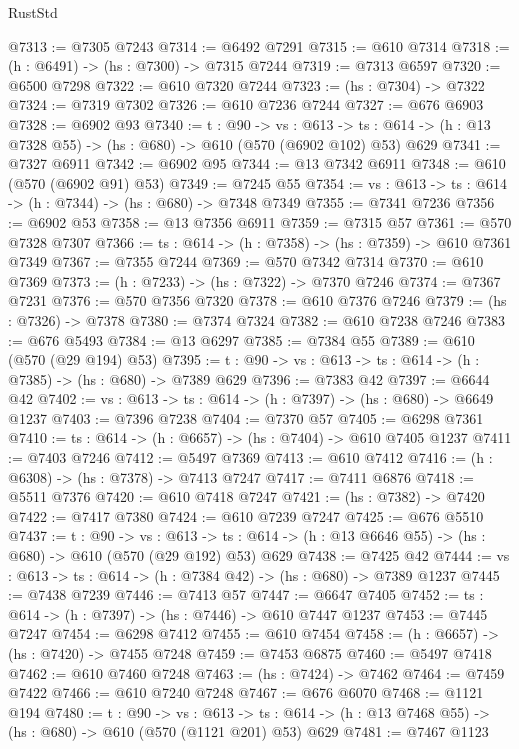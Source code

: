 \begin{lexlean}{RustStd}
\begin{coremodule}
@7313 := @7305 @7243
@7314 := @6492 @7291
@7315 := @610 @7314
@7318 := (h : @6491) -> (hs : @7300) -> @7315 @7244
@7319 := @7313 @6597
@7320 := @6500 @7298
@7322 := @610 @7320 @7244
@7323 := (hs : @7304) -> @7322
@7324 := @7319 @7302
@7326 := @610 @7236 @7244
@7327 := @676 @6903
@7328 := @6902 @93
@7340 := {t : @90} ->
  {vs : @613} ->
  {ts : @614} -> (h : @13 @7328 @55) -> (hs : @680) -> @610 (@570 (@6902 @102) @53) @629
@7341 := @7327 @6911
@7342 := @6902 @95
@7344 := @13 @7342 @6911
@7348 := @610 (@570 (@6902 @91) @53)
@7349 := @7245 @55
@7354 := {vs : @613} -> {ts : @614} -> (h : @7344) -> (hs : @680) -> @7348 @7349
@7355 := @7341 @7236
@7356 := @6902 @53
@7358 := @13 @7356 @6911
@7359 := @7315 @57
@7361 := @570 @7328 @7307
@7366 := {ts : @614} -> (h : @7358) -> (hs : @7359) -> @610 @7361 @7349
@7367 := @7355 @7244
@7369 := @570 @7342 @7314
@7370 := @610 @7369
@7373 := (h : @7233) -> (hs : @7322) -> @7370 @7246
@7374 := @7367 @7231
@7376 := @570 @7356 @7320
@7378 := @610 @7376 @7246
@7379 := (hs : @7326) -> @7378
@7380 := @7374 @7324
@7382 := @610 @7238 @7246
@7383 := @676 @5493
@7384 := @13 @6297
@7385 := @7384 @55
@7389 := @610 (@570 (@29 @194) @53)
@7395 := {t : @90} -> {vs : @613} -> {ts : @614} -> (h : @7385) -> (hs : @680) -> @7389 @629
@7396 := @7383 @42
@7397 := @6644 @42
@7402 := {vs : @613} -> {ts : @614} -> (h : @7397) -> (hs : @680) -> @6649 @1237
@7403 := @7396 @7238
@7404 := @7370 @57
@7405 := @6298 @7361
@7410 := {ts : @614} -> (h : @6657) -> (hs : @7404) -> @610 @7405 @1237
@7411 := @7403 @7246
@7412 := @5497 @7369
@7413 := @610 @7412
@7416 := (h : @6308) -> (hs : @7378) -> @7413 @7247
@7417 := @7411 @6876
@7418 := @5511 @7376
@7420 := @610 @7418 @7247
@7421 := (hs : @7382) -> @7420
@7422 := @7417 @7380
@7424 := @610 @7239 @7247
@7425 := @676 @5510
@7437 := {t : @90} ->
  {vs : @613} ->
  {ts : @614} -> (h : @13 @6646 @55) -> (hs : @680) -> @610 (@570 (@29 @192) @53) @629
@7438 := @7425 @42
@7444 := {vs : @613} -> {ts : @614} -> (h : @7384 @42) -> (hs : @680) -> @7389 @1237
@7445 := @7438 @7239
@7446 := @7413 @57
@7447 := @6647 @7405
@7452 := {ts : @614} -> (h : @7397) -> (hs : @7446) -> @610 @7447 @1237
@7453 := @7445 @7247
@7454 := @6298 @7412
@7455 := @610 @7454
@7458 := (h : @6657) -> (hs : @7420) -> @7455 @7248
@7459 := @7453 @6875
@7460 := @5497 @7418
@7462 := @610 @7460 @7248
@7463 := (hs : @7424) -> @7462
@7464 := @7459 @7422
@7466 := @610 @7240 @7248
@7467 := @676 @6070
@7468 := @1121 @194
@7480 := {t : @90} ->
  {vs : @613} ->
  {ts : @614} -> (h : @13 @7468 @55) -> (hs : @680) -> @610 (@570 (@1121 @201) @53) @629
@7481 := @7467 @1123

\end{coremodule}
\end{lexlean}
